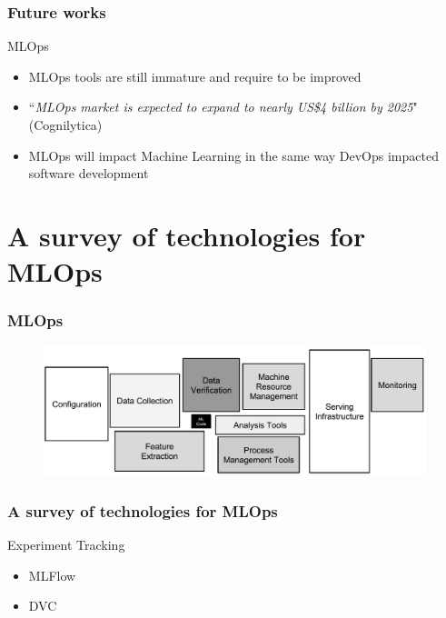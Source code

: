 \documentclass{beamer}
\begin{document}
\begin{frame}
\frametitle{Future works}

\begin{block}{MLOps} 
    \begin{itemize}
        \item MLOps tools are still immature and require to be improved
        \item ``\textit{MLOps market is expected to expand to nearly US\$4 billion by 2025}" (Cognilytica)
        \item MLOps will impact Machine Learning in the same way DevOps impacted software development
    \end{itemize}
\end{block}

\end{frame}

\section{A survey of technologies for MLOps}


\begin{frame}
\frametitle{MLOps}

\begin{figure}
\includegraphics[scale=0.3]{figure/ml_small_fraction.png}
\end{figure}

\end{frame}


\begin{frame}
\frametitle{A survey of technologies for MLOps}

\begin{block}{Experiment Tracking}
    \begin{itemize}
        \item MLFlow
        \item DVC
    \end{itemize}
\end{block}

\end{frame}
\end{document}
